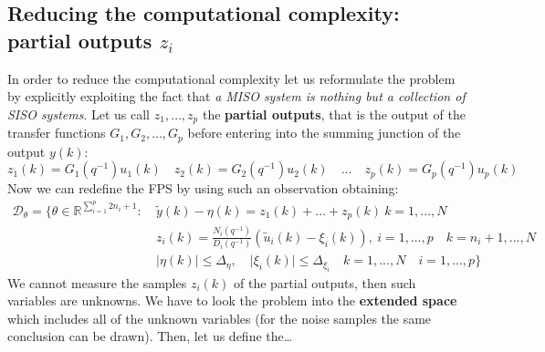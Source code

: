 \subsection{Reducing the computational complexity: partial outputs $z_i$}
In order to reduce the computational complexity let us reformulate the problem by explicitly exploiting the fact that \textit{a MISO system is nothing but a collection of SISO systems}. Let us call $z_1,\dots,z_p$ the \textbf{partial outputs}, that is the output of the transfer functions $G_1,G_2,\dots,G_p$ before entering into the summing junction of the output $y(k)$:
\begin{equation*}
    z_1(k)=G_1(q^{-1})u_1(k) \quad
    z_2(k)=G_2(q^{-1})u_2(k)  \quad \dots \quad
    z_p(k)=G_p(q^{-1})u_p(k)
\end{equation*}
Now we can redefine the FPS by using such an observation obtaining:
\begin{equation}
    \begin{aligned}
        \mathcal{D}_{\theta}=\big\{
            \theta\in\mathbb{R}^{\sum_{i=1}^p{2n_i+1}}: \ 
            &\tilde{y}(k)-\eta(k) = z_1(k)+\dots+z_p(k) \ k=1,...,N\\
            &z_i(k) = \frac{N_i(q^{-1})}{D_i(q^{-1})} (\tilde{u}_i(k)-\xi_i(k)), \ i=1,\dots,p \quad k=n_i+1,...,N\\
            &\vert \eta(k) \vert \le \Delta_\eta, \quad \vert \xi_i(k) \vert \le \Delta_{\xi_i} \quad k=1,...,N \quad i=1,...,p
        \big\}
    \end{aligned}
\end{equation}
We cannot measure the samples $z_i(k)$ of the partial outputs, then such variables are unknowns. We have to look the problem into the \textbf{extended space} which includes all of the unknown variables (for the noise samples the same conclusion can be drawn). Then, let us define the\dots

